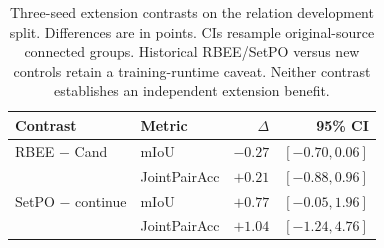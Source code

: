 \begin{table}[t]
\centering
\caption{Three-seed extension contrasts on the relation development split. Differences are in points. CIs resample original-source connected groups. Historical RBEE/SetPO versus new controls retain a training-runtime caveat. Neither contrast establishes an independent extension benefit.}
\label{tab:controls}
\small
\setlength{\tabcolsep}{3pt}
\begin{tabular}{@{}llrr@{}}
\toprule
Contrast & Metric & $\Delta$ & 95\% CI\\
\midrule
RBEE $-$ Cand & mIoU & $-0.27$ & $[-0.70,0.06]$\\
 & JointPairAcc & $+0.21$ & $[-0.88,0.96]$\\
SetPO $-$ continue & mIoU & $+0.77$ & $[-0.05,1.96]$\\
 & JointPairAcc & $+1.04$ & $[-1.24,4.76]$\\
\bottomrule
\end{tabular}
\end{table}
